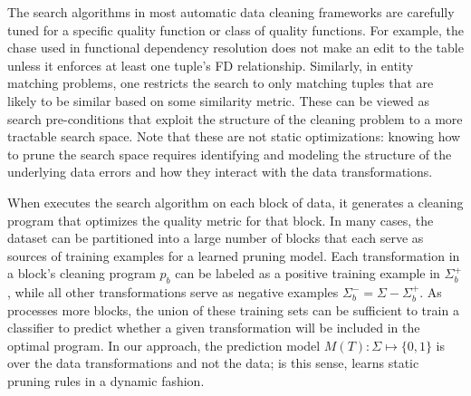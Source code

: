 The search algorithms in  most automatic data cleaning frameworks are carefully tuned for a specific quality function or class of quality functions. For example, the chase used in functional dependency resolution does not make an edit to the table unless it enforces at least one tuple's FD relationship.    Similarly, in entity matching problems, one restricts the search to only matching tuples that are likely to be similar based on some similarity metric.
These can be viewed as search pre-conditions that exploit the structure of the cleaning problem to a more tractable search space.
Note that these are not static optimizations: knowing how to prune the search space requires identifying and modeling the structure of the underlying data errors and how they interact with the data transformations.


When \sys executes the search algorithm on each block of data, it generates a cleaning program that optimizes the quality metric for that block.  In many cases, the dataset can be partitioned into a large number of blocks that each serve as sources of training examples for a learned pruning model.  Each transformation in a block's  cleaning program $p_b$ can be labeled as a positive training example in $\Sigma_b^+$, while all other transformations serve as negative examples $\Sigma_b^- = \Sigma - \Sigma_b^+$.
As \sys processes more blocks, the union of these training sets can be sufficient to train a classifier to predict whether a given transformation will be included in the optimal program.  In our approach, the prediction model $M(T): \Sigma \mapsto \{0,1\}$ is over the data transformations and not the data; is this sense, \sys learns static pruning rules in a dynamic fashion.    


